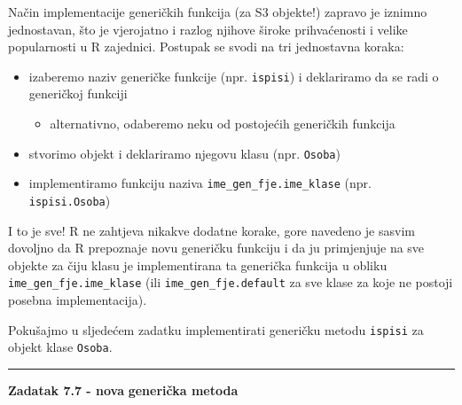 \documentclass[]{book}
\providecommand{\tightlist}{%
  \setlength{\itemsep}{0pt}\setlength{\parskip}{0pt}}
\theoremstyle{definition}
\theoremstyle{definition}
\theoremstyle{definition}
\theoremstyle{remark}
\begin{document}
Način implementacije generičkih funkcija (za S3 objekte!) zapravo je
iznimno jednostavan, što je vjerojatno i razlog njihove široke
prihvaćenosti i velike popularnosti u R zajednici. Postupak se svodi na
tri jednostavna koraka:

\begin{itemize}
\tightlist
\item
  izaberemo naziv generičke funkcije (npr. \texttt{ispisi}) i
  deklariramo da se radi o generičkoj funkciji

  \begin{itemize}
  \tightlist
  \item
    alternativno, odaberemo neku od postojećih generičkih funkcija
  \end{itemize}
\item
  stvorimo objekt i deklariramo njegovu klasu (npr. \texttt{Osoba})
\item
  implementiramo funkciju naziva \texttt{ime\_gen\_fje.ime\_klase} (npr.
  \texttt{ispisi.Osoba})
\end{itemize}

I to je sve! R ne zahtjeva nikakve dodatne korake, gore navedeno je
sasvim dovoljno da R prepoznaje novu generičku funkciju i da ju
primjenjuje na sve objekte za čiju klasu je implementirana ta generička
funkcija u obliku \texttt{ime\_gen\_fje.ime\_klase} (ili
\texttt{ime\_gen\_fje.default} za sve klase za koje ne postoji posebna
implementacija).

Pokušajmo u sljedećem zadatku implementirati generičku metodu
\texttt{ispisi} za objekt klase \texttt{Osoba}.

\begin{center}\rule{0.5\linewidth}{\linethickness}\end{center}

\textbf{Zadatak 7.7 - nova } \textbf{generička metoda}
\end{document}
